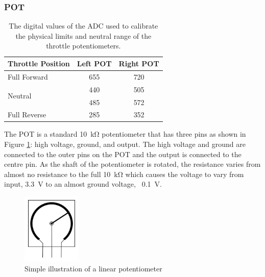		\subsubsection{POT}
			\begin{table}[ht]
			\begin{center}
				\caption{The digital values of the ADC used to calibrate the physical limits and neutral range of the throttle potentiometers.}
				\label{tab:3:POT}
				\begin{tabular}{|l|c|c|}
					\hline		
					\textbf{Throttle Position} & \textbf{Left POT} & \textbf{Right POT} \\
					\hline
					Full Forward & 655 & 720\\
					\hline
					\multirow{2}{*}{Neutral} &440 &505 \\
					&485 &572  \\
					\hline
					Full Reverse & 285 & 352 \\
					\hline
				\end{tabular}
			\end{center}
		\end{table}
		The POT is a standard \SI{10}{\kilo\ohm} potentiometer that has three pins as shown in Figure \ref{fig:3:POTdraw}: high voltage, ground, and output. The high voltage and ground are connected to the outer pins on the POT and the output is connected to the centre pin. As the shaft of the potentiometer is rotated, the resistance varies from almost no resistance to the full \SI{10}{\kilo\ohm} which causes the voltage to vary from input, \SI{3.3}{\volt} to an almost ground voltage, ~\SI{0.1}{\volt}.  \par
		\vspace{0.4cm}
		\begin{figure}[hb]
			\begin{center}
				\includegraphics[width = 0.25\textwidth]{figures/POT.jpg}
				\caption{Simple illustration of a linear potentiometer}
				\label{fig:3:POTdraw}
			\end{center}
		\end{figure}
